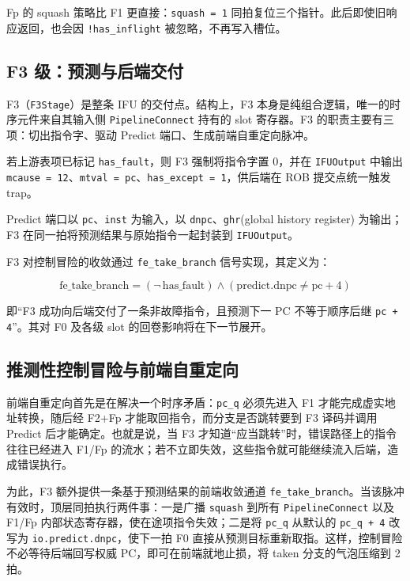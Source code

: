 Fp 的 squash 策略比 F1 更直接：\lstinline|squash = 1| 同拍复位三个指针。此后即使旧响应返回，也会因 \lstinline|!has_inflight| 被忽略，不再写入槽位。

\subsection{F3 级：预测与后端交付}

F3（\lstinline|F3Stage|）是整条 IFU 的交付点。结构上，F3 本身是纯组合逻辑，唯一的时序元件来自其输入侧 \lstinline|PipelineConnect| 持有的 slot 寄存器。F3 的职责主要有三项：切出指令字、驱动 Predict 端口、生成前端自重定向脉冲。

若上游表项已标记 \lstinline|has_fault|，则 F3 强制将指令字置 0，并在 \lstinline|IFUOutput| 中输出 \lstinline|mcause = 12|、\lstinline|mtval = pc|、\lstinline|has_except = 1|，供后端在 ROB 提交点统一触发 trap。

Predict 端口以 \lstinline|pc|、\lstinline|inst| 为输入，以 \lstinline|dnpc|、\lstinline|ghr|(global history register) 为输出；F3 在同一拍将预测结果与原始指令一起封装到 \lstinline|IFUOutput|。

F3 对控制冒险的收敛通过 \lstinline|fe_take_branch| 信号实现，其定义为：

\[
\mathrm{fe\_take\_branch} = (\neg\,\mathrm{has\_fault}) \wedge (\mathrm{predict.dnpc} \neq \mathrm{pc} + 4)
\]

即“F3 成功向后端交付了一条非故障指令，且预测下一 PC 不等于顺序后继 \lstinline|pc + 4|”。其对 F0 及各级 slot 的回卷影响将在下一节展开。

\subsection{推测性控制冒险与前端自重定向}\label{sec:ifu-redirect}

前端自重定向首先是在解决一个时序矛盾：\lstinline|pc_q| 必须先进入 F1 才能完成虚实地址转换，随后经 F2+Fp 才能取回指令，而分支是否跳转要到 F3 译码并调用 Predict 后才能确定。也就是说，当 F3 才知道“应当跳转”时，错误路径上的指令往往已经进入 F1/Fp 的流水；若不立即失效，这些指令就可能继续流入后端，造成错误执行。

为此，F3 额外提供一条基于预测结果的前端收敛通道 \lstinline|fe_take_branch|。当该脉冲有效时，顶层同拍执行两件事：一是广播 \lstinline|squash| 到所有 \lstinline|PipelineConnect| 以及 F1/Fp 内部状态寄存器，使在途项指令失效；二是将 \lstinline|pc_q| 从默认的 \lstinline|pc_q + 4| 改写为 \lstinline|io.predict.dnpc|，使下一拍 F0 直接从预测目标重新取指。这样，控制冒险不必等待后端回写权威 PC，即可在前端就地止损，将 taken 分支的气泡压缩到 2 拍。

